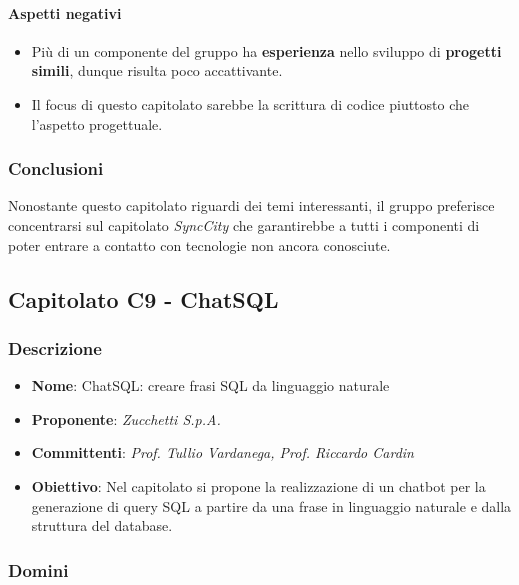 \documentclass[italian,12pt]{article} %
\begin{document}
\paragraph{Aspetti negativi}
\begin{itemize}
	\item Più di un componente del gruppo ha \textbf{esperienza} nello sviluppo di \textbf{progetti simili}, dunque risulta poco accattivante.
	\item Il focus di questo capitolato sarebbe la scrittura di codice piuttosto che l'aspetto progettuale.
\end{itemize}

\subsubsection{Conclusioni}
Nonostante questo capitolato riguardi dei temi interessanti, il gruppo preferisce concentrarsi
sul capitolato \textit{SyncCity} che garantirebbe a tutti i componenti di poter entrare a contatto
con tecnologie non ancora conosciute.

\subsection{Capitolato C9 - ChatSQL}

\subsubsection{Descrizione}
\begin{itemize}
	\item \textbf{Nome}: ChatSQL: creare frasi SQL da linguaggio naturale
	\item \textbf{Proponente}: {\it Zucchetti S.p.A.}
	\item \textbf{Committenti}: {\it Prof. Tullio Vardanega, Prof. Riccardo Cardin}
	\item \textbf{Obiettivo}: Nel capitolato si propone la realizzazione di un chatbot per la generazione di query SQL a partire da una frase in linguaggio naturale e dalla struttura del database.
\end{itemize}

\subsubsection{Domini}
\end{document}
